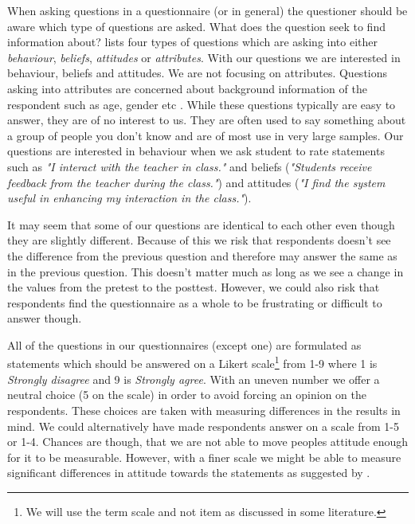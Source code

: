 When asking questions in a questionnaire (or in general) the questioner should be aware which type of questions are asked. What does the question seek to find information about?  lists four types of questions which are asking into either \emph{behaviour}, \emph{beliefs}, \emph{attitudes} or \emph{attributes}. With our questions we are interested in behaviour, beliefs and attitudes. We are not focusing on attributes. Questions asking into attributes are concerned about background information of the respondent such as age, gender etc \cite[p.~75]{deacon2007researching}. While these questions typically are easy to answer, they are of no interest to us. They are often used to say something about a group of people you don't know and are of most use in very large samples. Our questions are interested in behaviour when we ask student to rate statements such as \emph{"I interact with the teacher in class."} and beliefs (\emph{"Students receive feedback from the teacher during the class."}) and attitudes (\emph{"I find the system useful in enhancing my interaction in the class."}).

It may seem that some of our questions are identical to each other even though they are slightly different. Because of this we risk that respondents doesn't see the difference from the previous question and therefore may answer the same as in the previous question. This doesn't matter much as long as we see a change in the values from the pretest to the posttest. However, we could also risk that respondents find the questionnaire as a whole to be frustrating or difficult to answer though.

All of the questions in our questionnaires (except one) are formulated as statements which should be answered on a Likert scale\footnote{We will use the term scale and not item as discussed in some literature.} \cite{likert1932technique} from 1-9 where 1 is \emph{Strongly disagree} and 9 is \emph{Strongly agree}. With an uneven number we offer a neutral choice (5 on the scale) in order to avoid forcing an opinion on the respondents. These choices are taken with measuring differences in the results in mind. We could alternatively have made respondents answer on a scale from 1-5 or 1-4. Chances are though, that we are not able to move peoples attitude enough for it to be measurable. However, with a finer scale we might be able to measure significant differences in attitude towards the statements as suggested by . 



